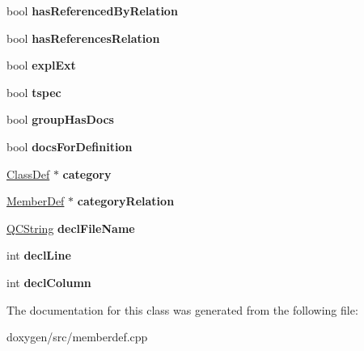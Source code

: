 \begin{DoxyCompactItemize}
bool {\bfseries has\+Referenced\+By\+Relation}
\item 
\mbox{\label{class_member_def_impl_a2063ad798fbc2cd317749770a3315716}} 
bool {\bfseries has\+References\+Relation}
\item 
\mbox{\label{class_member_def_impl_a89bc9538fe5bfcdcfdba9359f4f4779d}} 
bool {\bfseries expl\+Ext}
\item 
\mbox{\label{class_member_def_impl_a4e432399e49ba85d32fcfea646f66c4a}} 
bool {\bfseries tspec}
\item 
\mbox{\label{class_member_def_impl_afeb705ca84e31b23b89cf9e1730587ef}} 
bool {\bfseries group\+Has\+Docs}
\item 
\mbox{\label{class_member_def_impl_a82e5e571636549865c589888f02a2b8e}} 
bool {\bfseries docs\+For\+Definition}
\item 
\mbox{\label{class_member_def_impl_a12955f1ceca622ed822fd55724ebe152}} 
\mbox{\hyperlink{class_class_def}{Class\+Def}} $\ast$ {\bfseries category}
\item 
\mbox{\label{class_member_def_impl_a40816d9db7c350c93477f9594b86638d}} 
\mbox{\hyperlink{class_member_def}{Member\+Def}} $\ast$ {\bfseries category\+Relation}
\item 
\mbox{\label{class_member_def_impl_acf7fce642cc31771f059bb50dfdf1bf4}} 
\mbox{\hyperlink{class_q_c_string}{Q\+C\+String}} {\bfseries decl\+File\+Name}
\item 
\mbox{\label{class_member_def_impl_ae59b5fac161875f487d5cbfd62f1928e}} 
int {\bfseries decl\+Line}
\item 
\mbox{\label{class_member_def_impl_adf75b976267d6236816dc07c3e63797d}} 
int {\bfseries decl\+Column}
\end{DoxyCompactItemize}


The documentation for this class was generated from the following file\+:\begin{DoxyCompactItemize}
\item 
doxygen/src/memberdef.\+cpp\end{DoxyCompactItemize}
